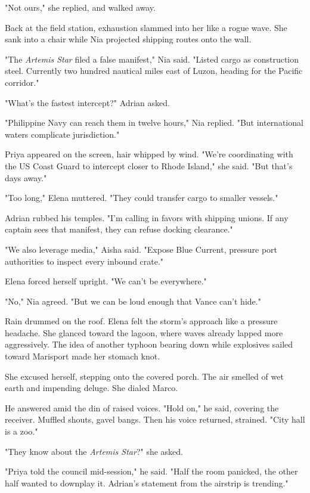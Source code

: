 "Not ours," she replied, and walked away.

\bigskip

Back at the field station, exhaustion slammed into her like a rogue wave. She sank into a chair while Nia projected shipping routes onto the wall.

"The \textit{Artemis Star} filed a false manifest," Nia said. "Listed cargo as construction steel. Currently two hundred nautical miles east of Luzon, heading for the Pacific corridor."

"What's the fastest intercept?" Adrian asked.

"Philippine Navy can reach them in twelve hours," Nia replied. "But international waters complicate jurisdiction."

Priya appeared on the screen, hair whipped by wind. "We're coordinating with the US Coast Guard to intercept closer to Rhode Island," she said. "But that's days away."

"Too long," Elena muttered. "They could transfer cargo to smaller vessels."

Adrian rubbed his temples. "I'm calling in favors with shipping unions. If any captain sees that manifest, they can refuse docking clearance."

"We also leverage media," Aisha said. "Expose Blue Current, pressure port authorities to inspect every inbound crate."

Elena forced herself upright. "We can't be everywhere."

"No," Nia agreed. "But we can be loud enough that Vance can't hide."

Rain drummed on the roof. Elena felt the storm's approach like a pressure headache. She glanced toward the lagoon, where waves already lapped more aggressively. The idea of another typhoon bearing down while explosives sailed toward Marisport made her stomach knot.

She excused herself, stepping onto the covered porch. The air smelled of wet earth and impending deluge. She dialed Marco.

He answered amid the din of raised voices. "Hold on," he said, covering the receiver. Muffled shouts, gavel bangs. Then his voice returned, strained. "City hall is a zoo."

"They know about the \textit{Artemis Star}?" she asked.

"Priya told the council mid-session," he said. "Half the room panicked, the other half wanted to downplay it. Adrian's statement from the airstrip is trending."

